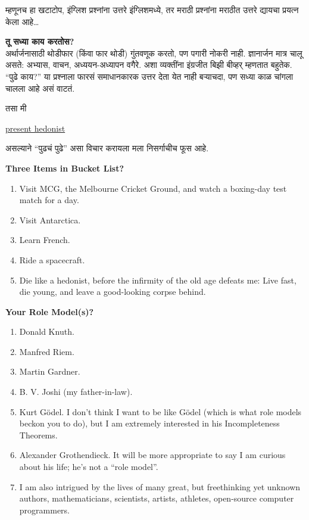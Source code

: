 \documentclass[17pt]{extarticle}  %
\begin{document}
म्हणूनच हा खटाटोप, इंग्लिश प्रश्नांना उत्तरे इंग्लिशमध्ये, तर मराठी प्रश्नांना मराठीत उत्तरे द्यायचा प्रयत्न केला आहे\dots

\begin{enumerate}
\item
\textbf{तू सध्या काय करतोस?}\\
अर्थार्जनासाठी थोडीफार (किंवा फार थोडी) गुंतवणूक करतो, पण पगारी नोकरी नाही. ज्ञानार्जन मात्र चालू असते: अभ्यास, वाचन, अध्ययन-अध्यापन वगैरे. अशा व्यक्तींना इंग्रजीत बिझी बीव्हर् म्हणतात बहुतेक. \enquote{पुढे काय?} या प्रश्नाला फारसं समाधानकारक उत्तर देता येत नाही बऱ्याचदा, पण सध्या काळ चांगला चालला आहे असं वाटतं. 

तसा मी \begin{english} \href{https://en.wikipedia.org/wiki/Hedonism}{present hedonist}\end{english} असल्याने \enquote{पुढचं पुढे} असा विचार करायला मला निसर्गाचीच फूस आहे.

\begin{english}

\item \textbf{Three Items in Bucket List?}\\
\begin{enumerate}
\item Visit MCG, the Melbourne Cricket Ground, and watch a boxing-day test match for a day.
\item Visit Antarctica.
\item Learn French.
\item Ride a spacecraft.
\item Die like a hedonist, before the infirmity of the old age defeats me: Live fast, die young, and leave a good-looking corpse behind.
\end{enumerate}

\item 
\textbf{Your Role Model(s)?}\\
\begin{enumerate}
\item Donald Knuth.
\item Manfred Riem.
\item Martin Gardner.
\item B. V. Joshi (my father-in-law).
\item Kurt G\"odel. I don't think I want to be like G\"odel (which is what role models beckon you to do), but I am extremely interested in his Incompleteness Theorems.
\item Alexander Grothendieck. It will be more appropriate to say I am curious about his life; he's not a \enquote{role model}.
\item I am also intrigued by the lives of many great, but freethinking yet unknown authors, mathematicians, scientists, artists, athletes, open-source computer programmers.
\end{enumerate}


\end{english}
\end{enumerate}
\end{document}
